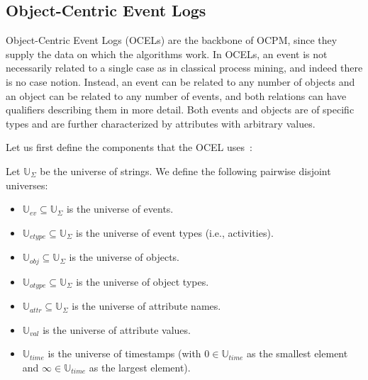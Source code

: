     
    
    \subsection{Object-Centric Event Logs} 
    \label{chap:my-ocel-definition}
    
    
    
    Object-Centric Event Logs (OCELs) are the backbone of OCPM, since they supply the data on which the algorithms work.
    In OCELs, an event is not necessarily related to a single case as in classical process mining, and indeed there is no case notion.
    Instead, an event can be related to any number of objects and an object can be related to any number of events, and both relations can have qualifiers describing them in more detail.
    Both events and objects are of specific types and are further characterized by attributes with arbitrary values.
    
    
    Let us first define the components that the OCEL uses~\autocite{ocel20}:
    
    \begin{definition}[Universes]
    Let $\mathbb{U}_\Sigma$ be the universe of strings. We define the following pairwise disjoint universes:
    \begin{itemize}
        \item $\mathbb{U}_{ev} \subseteq \mathbb{U}_\Sigma$ is the universe of events.
        \item $\mathbb{U}_{etype} \subseteq \mathbb{U}_\Sigma$ is the universe of event types (i.e., activities).
        \item $\mathbb{U}_{obj} \subseteq \mathbb{U}_\Sigma$ is the universe of objects.
        \item $\mathbb{U}_{otype} \subseteq \mathbb{U}_\Sigma$ is the universe of object types.
        \item $\mathbb{U}_{attr} \subseteq \mathbb{U}_\Sigma$ is the universe of attribute names.
        \item $\mathbb{U}_{val}$ is the universe of attribute values.
        \item $\mathbb{U}_{time}$ is the universe of timestamps (with $0 \in \mathbb{U}_{time}$ as the smallest element and $\infty \in \mathbb{U}_{time}$ as the largest element).
    \end{itemize}
    \end{definition}
    

